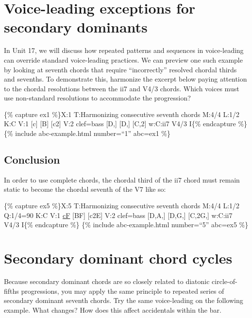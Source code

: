 \documentclass{book}
\begin{document}
\hypertarget{voice-leading-exceptions-for-secondary-dominants}{%
\section{Voice-leading exceptions for secondary
dominants}\label{voice-leading-exceptions-for-secondary-dominants}}

In Unit 17, we will discuss how repeated patterns and sequences in
voice-leading can override standard voice-leading practices. We can preview
one such example by looking at seventh chords that require ``incorrectly''
resolved chordal thirds and sevenths. To demonstrate this, harmonize the
excerpt below paying attention to the chordal resolutions between the ii7 and
V4/3 chords. Which voices must use non-standard resolutions to accommodate the
progression?

\{\% capture ex1 \%\}X:1 T:Harmonizing consecutive seventh chords M:4/4 L:1/2
K:C V:1 {[}c{]} {[}B{]}\textbar{} {[}c2{]}\textbar{]} V:2 clef=bass {[}D,{]}
{[}D,{]}\textbar{} {[}C,2{]}\textbar{]} w:C:ii7 V4/3 I\{\% endcapture \%\}
\{\% include abc-example.html number=``1'' abc=ex1 \%\}

\hypertarget{conclusion-21}{%
\subsection{Conclusion}\label{conclusion-21}}

In order to use complete chords, the chordal third of the ii7 chord must
remain static to become the chordal seventh of the V7 like so:

\{\% capture ex5 \%\}X:5 T:Harmonizing consecutive seventh chords M:4/4 L:1/2
Q:1/4=90 K:C V:1 \href{cantusFirmus.html}{cF} {[}BF{]}\textbar{}
{[}c2E{]}\textbar{]} V:2 clef=bass {[}D,A,{]} {[}D,G,{]}\textbar{}
{[}C,2G,{]}\textbar{]} w:C:ii7 V4/3 I\{\% endcapture \%\} \{\% include
abc-example.html number=``5'' abc=ex5 \%\}

\hypertarget{secondary-dominant-chord-cycles}{%
\section{Secondary dominant chord
cycles}\label{secondary-dominant-chord-cycles}}

Because secondary dominant chords are so closely related to diatonic
circle-of-fifths progressions, you may apply the same principle to repeated
series of secondary dominant seventh chords. Try the same voice-leading on the
following example. What changes? How does this affect accidentals within the
bar.
\end{document}

